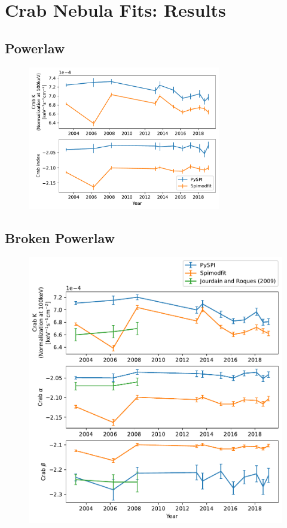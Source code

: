 \documentclass{report}
\begin{document}
\chapter{Crab Nebula Fits: Results}

\section{Powerlaw}
\begin{figure}[h]
  \centering
  \includegraphics[width=0.75\textwidth]{Images/Crab_Fits/crab_low_energy_pl.pdf}
  \caption{}
  \label{}
\end{figure}

\section{Broken Powerlaw}

\begin{figure}[h]
  \centering
  \includegraphics[width=.75\textwidth]{Images/Crab_Fits/crab_brk_pl_100.pdf}
  \caption{}
  \label{}
\end{figure}
\end{document}
